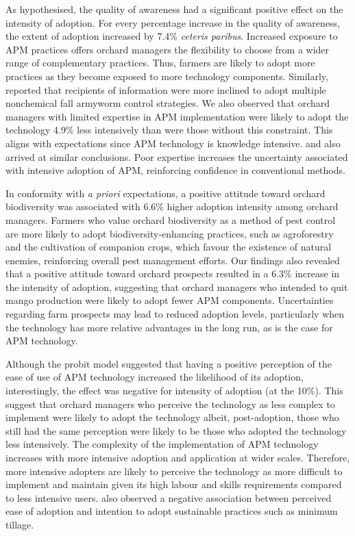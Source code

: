 \documentclass[fleqn,twoside,reqno]{article}
\begin{document}
As hypothesised, the quality of awareness had a significant positive effect on the intensity of adoption. For every percentage increase in the quality of awareness, the extent of adoption increased by 7.4\% \textit{ceteris paribus}. Increased exposure to APM practices offers orchard managers the flexibility to choose from a wider range of complementary practices. Thus, farmers are likely to adopt more practices as they become exposed to more technology components. Similarly, \cite{Tambo2023} reported that recipients of information were more inclined to adopt multiple nonchemical fall armyworm control strategies. We also observed that orchard managers with limited expertise in APM implementation were likely to adopt the technology 4.9\% less intensively than were those without this constraint. This aligns with expectations since APM technology is knowledge intensive. \cite{Despotovic2019} and \cite{Wangithi2021} also arrived at similar conclusions. Poor expertise increases the uncertainty associated with intensive adoption of APM, reinforcing confidence in conventional methods.

In conformity with \textit{a priori} expectations, a positive attitude toward orchard biodiversity was associated with 6.6\% higher adoption intensity among orchard managers. Farmers who value orchard biodiversity as a method of pest control are more likely to adopt biodiversity-enhancing practices, such as agroforestry and the cultivation of companion crops, which favour the existence of natural enemies, reinforcing overall pest management efforts. Our findings also revealed that a positive attitude toward orchard prospects resulted in a 6.3\% increase in the intensity of adoption, suggesting that orchard managers who intended to quit mango production were likely to adopt fewer APM components. Uncertainties regarding farm prospects may lead to reduced adoption levels, particularly when the technology has more relative advantages in the long run, as is the case for APM technology.

Although the probit model suggested that having a positive perception of the ease of use of APM technology increased the likelihood of its adoption, interestingly, the effect was negative for intensity of adoption (at the 10\%). This suggest that orchard managers who perceive the technology as less complex to implement were likely to adopt the technology albeit, post-adoption, those who still had the same perception were likely to be those who adopted the technology less intensively. The complexity of the implementation of APM technology increases with more intensive adoption and application at wider scales. Therefore, more intensive adopters are likely to perceive the technology as more difficult to implement and maintain given its high labour and skills requirements compared to less intensive users. \cite{Zeweld2017} also observed a negative association between perceived ease of adoption and intention to adopt sustainable practices such as minimum tillage.
\end{document}
